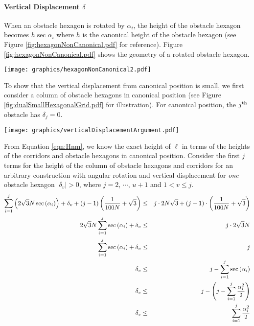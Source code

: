 \paragraph{Vertical Displacement $\delta$}

When an obstacle hexagon is rotated by $\alpha_i$, the height of the obstacle hexagon becomes $h \sec \alpha_i$ where $h$ is the canonical height of the obstacle hexagon (see Figure \ref{fig:hexagonNonCanonical.pdf} for reference).
Figure \ref{fig:hexagonNonCanonical.pdf} shows the geometry of a rotated obstacle hexagon.

\begin{minipage}{\linewidth}
\begin{center}
\texttt{[image: graphics/hexagonNonCanonical2.pdf]}
\label{fig:hexagonNonCanonical.pdf}
\end{center}
\end{minipage}

To show that the vertical displacement from canonical position is small, we first consider a column of obstacle hexagons in canonical position (see Figure \ref{fig:dualSmallHexagonalGrid.pdf} for illustration).  
For canonical position, the $j^\text{th}$ obstacle has $\delta_j = 0$.

\begin{minipage}{\linewidth}
\begin{center}
\texttt{[image: graphics/verticalDisplacementArgument.pdf]}
\label{fig:verticalDisplacementArgument.pdf}
\end{center}
\end{minipage}

From Equation \ref{eqn:Hnm}, we know the exact height of $\ell$ in terms of the heights of the corridors and obstacle hexagons in canonical position.  
Consider the first $j$ terms for the height of the column of obstacle hexagons and corridors for an arbitrary construction with angular rotation and vertical displacement for \textit{one} obstacle hexagon $\vert \delta_v \vert > 0$, where $j=2$, $\cdots$, $u+1$ and $1 < v \leq j$.
\begin{eqnarray*}
\sum_{i=1}^j \left( 2 \sqrt{3} N \sec \left(  \alpha_i \right) \right) + \delta_v  + (j-1) \left( \frac{1}{100N}+\sqrt{3} \right) &\leq& j \cdot 2 N \sqrt{3} + (j-1) \cdot \left( \frac{1}{100N}+\sqrt{3} \right)\\
2 \sqrt{3} N \sum_{i=1}^j \sec \left( \alpha_i \right) + \delta_ v &\leq& j \cdot 2 \sqrt{3} N \\
\sum_{i=1}^j \sec \left( \alpha_i \right) + \delta_v &\leq& j\\
 \delta_v &\leq& j- \sum_{i=1}^j \sec \left( \alpha_i \right)\\
 \delta_v &\leq& j - \left( j - \sum_{i=1}^j \frac{\alpha_i^2}{2} \right)\\
\delta_v &\leq&  \sum_{i=1}^j \frac{\alpha_i^2}{2}
\end{eqnarray*}

